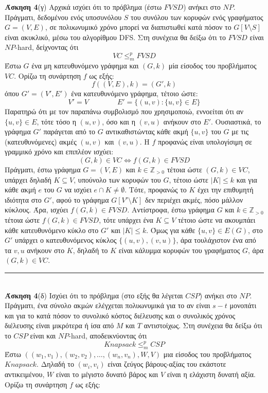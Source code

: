 \documentclass[12pt]{article}
\newcommand\en[1]{\latintext #1\greektext}
\newcommand{\HRule}{\rule{\linewidth}{0.1mm}}
\begin{document}
{\bf Άσκηση 4}(γ) Αρχικά ισχύει ότι το πρόβλημα (έστω $FVSD$) ανήκει στο $NP$. Πράγματι, δεδομένου ενός υποσυνόλου $S$ του συνόλου των κορυφών ενός γραφήματος $G=(V,E)$, σε πολυωνυμικό χρόνο μπορεί να διαπιστωθεί κατά πόσον το $G[V\setminus S]$ είναι ακυκλικό, μέσω του αλγορίθμου \en{DFS}. Στη συνέχεια θα δείξω ότι το $FVSD$ είναι $NP$-\en{hard}, δείχνοντας ότι
$$VC\leq_m^p FVSD$$
Έστω $G$ ένα μη κατευθυνόμενο γράφημα και $(G,k)$ μία είσοδος του προβλήματος $VC$. Ορίζω τη συνάρτηση $f$ ως εξής:
$$f((V,E),k)=(G',k)$$
όπου $G'=(V',E')$ ένα κατευθυνόμενο γράφημα, τέτοιο ώστε:
$$V'=V\qquad\qquad E'=\{(u,v):\{u,v\}\in E\}$$
Παρατηρώ ότι με τον παραπάνω συμβολισμό που χρησιμοποιώ, εννοείται ότι αν $\{u,v\}\in E$, τότε τόσο η $(u,v)$, όσο και η $(v,u)$ ανήκουν στο $E'$. Ουσιαστικά, το γράφημα $G'$ παράγεται από το $G$ αντικαθιστώντας κάθε ακμή $\{u,v\}$ του $G$ με τις (κατευθυνόμενες) ακμές $(u,v)$ και $(v,u)$. Η $f$ προφανώς είναι υπολογίσιμη σε γραμμικό χρόνο και επιπλέον ισχύει:
$$(G,k)\in VC\Leftrightarrow f(G,k)\in FVSD$$
Πράγματι, έστω γράφημα $G=(V,E)$ και $k\in\mathbb{Z}_{>0}$ τέτοια ώστε $(G,k)\in VC$, υπάρχει δηλαδή $Κ\subseteq V$, υπούνολο των κορυφών του $G$, τέτοιο ώστε $|K|\leq k$ και για κάθε ακμή $e$ του $G$ να ισχύει $e\cap K\neq\emptyset$. Τότε, προφανώς το $K$ έχει την επιθυμητή ιδιότητα στο $G'$, αφού το γράφημα $G[V'\setminus K]$ δεν περιέχει ακμές, πόσο μάλλον κύκλους. Άρα, ισχύει $f(G,k)\in FVSD$. Αντίστροφα, έστω γράφημα $G$ και $k\in\mathbb{Z}_{>0}$ τέτοια ώστε $f(G,k)\in FVSD$, τότε υπάρχει ένα $K\subseteq V$ τέτοιο ώστε να ακουμπάει κάθε κατευθυνόμενο κύκλο στο $G'$ και $|Κ|\leq k$. Όμως για κάθε $\{u,v\}\in E(G)$, στο $G'$ υπάρχει ο κατευθυνόμενος κύκλος $\{(u,v),(v,u)\}$, άρα τουλάχιστον ένα από τα $v,u$ ανήκουν στο $K$, δηλαδή το $K$ είναι κάλυμμα κορυφών του γραφήματος $G$, άρα $(G,k)\in VC$.\\\HRule\\
{\bf Άσκηση 4}(δ) Ισχύει ότι το πρόβλημα (στο εξής θα λέγεται $CSP$) ανήκει στο $NP$. Πράγματι, ένα σύνολο ακμών ελέγχεται πολυωνυμικά για το αν είναι $s-t$ μονοπάτι και για το κατά πόσον το συνολικό κόστος διέλευσης και ο συνολικός χρόνος διέλευσης είναι μικρότερα ή ίσα από $M$ και $T$ αντιστοίχως. Στη συνέχεια θα δείξω ότι το $CSP$ είναι και $NP$-\en{hard}, αποδεικνύοντας ότι
$$Knapsack\leq_m^p CSP$$
Έστω $((w_1,v_1),(w_2,v_2),\ldots,(w_n,v_n),W,V)$ μια είσοδος του προβλήματος $Knapsack$. Δηλαδή το $(w_i,v_i)$ είναι ζεύγος βάρους-αξίας του εκάστοτε αντικειμένου, $W$ είναι το μέγιστο δυνατό βάρος και $V$ είναι η ελάχιστη δυνατή αξία. Ορίζω τη συνάρτηση $f$ ως εξής:
\end{document}
